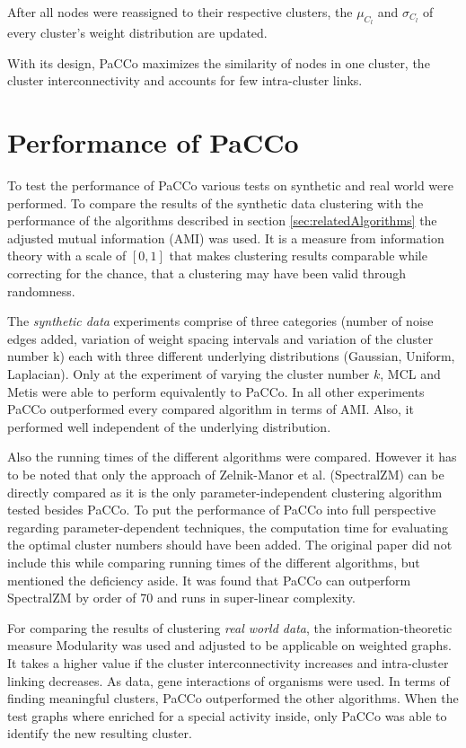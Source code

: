 \documentclass[12pt,journal,compsoc]{IEEEtran}
\numberwithin{equation}{section}
\begin{document}
After all nodes were reassigned to their respective clusters, the $ \mu_{C_{l}} $ and $ \sigma_{C_{l}} $ of every cluster's weight distribution are updated.  

With its design, PaCCo maximizes the similarity of nodes in one cluster, the cluster interconnectivity and accounts for few intra-cluster links.

\section{Performance of PaCCo}
\label{sec:perfomance}
To test the performance of PaCCo various tests on synthetic and real world were performed. To compare the results of the synthetic data clustering with the performance of the algorithms described in section \ref{sec:relatedAlgorithms} the adjusted mutual information (AMI) was used. It is a measure from information theory with a scale of $ [0,1] $ that makes clustering results comparable while correcting for the chance, that a clustering may have been valid through randomness.

The \textit{synthetic data } experiments comprise of three categories (number of noise edges added, variation of weight spacing intervals and variation of the cluster number k) each with three different underlying distributions (Gaussian, Uniform, Laplacian). Only at the experiment of varying the cluster number $ k $, MCL and Metis were able to perform equivalently to PaCCo. In all other experiments PaCCo outperformed every compared algorithm in terms of AMI. Also, it performed well independent of the underlying distribution.

Also the running times of the different algorithms were compared. However it has to be noted that only the approach of Zelnik-Manor et al. (SpectralZM) \cite{zelnik2004self} can be directly compared as it is the only parameter-independent clustering algorithm tested besides PaCCo. To put the performance of PaCCo into full perspective regarding parameter-dependent techniques, the computation time for evaluating the optimal cluster numbers should have been added. The original paper did not include this while comparing running times of the different algorithms, but mentioned the deficiency aside. It was found that PaCCo can outperform SpectralZM by order of 70 and runs in super-linear complexity.

For comparing the results of clustering\textit{ real world data}, the information-theoretic measure Modularity was used and adjusted to be applicable on weighted graphs. It takes a higher value if the cluster interconnectivity increases and intra-cluster linking decreases. As data, gene interactions of organisms were used. In terms of finding meaningful clusters, PaCCo outperformed the other algorithms. When the test graphs where enriched for a special activity inside, only PaCCo was able to identify the new resulting cluster.
\end{document}
